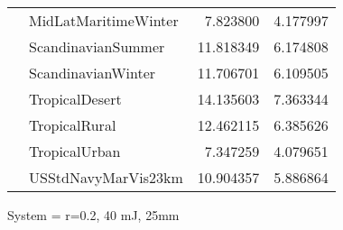\begin{tabular}{llrr}
             & MidLatMaritimeWinter &   7.823800 &   4.177997 \\
             & ScandinavianSummer &  11.818349 &   6.174808 \\
             & ScandinavianWinter &  11.706701 &   6.109505 \\
             & TropicalDesert &  14.135603 &   7.363344 \\
             & TropicalRural &  12.462115 &   6.385626 \\
             & TropicalUrban &   7.347259 &   4.079651 \\
             & USStdNavyMarVis23km &  10.904357 &   5.886864 \\
\bottomrule
\end{tabular}


\clearpage
System = r=0.2, 40 mJ, 25mm

